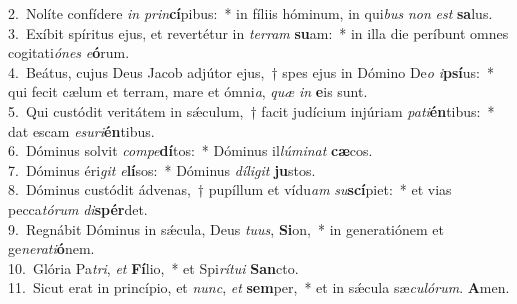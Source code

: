 {2.~}Nolíte confídere \textit{in} \textit{prin}\textbf{cí}pibus:~* in fíliis hóminum, in qui\textit{bus} \textit{non} \textit{est} \textbf{sa}lus.\\
{3.~}Exíbit spíritus ejus, et revertétur in \textit{ter}\textit{ram} \textbf{su}am:~* in illa die períbunt omnes cogitati\textit{ó}\textit{nes} \textit{e}\textbf{ó}rum.\\
{4.~}Beátus, cujus Deus Jacob adjútor ejus,~† spes ejus in Dómino De\textit{o} \textit{i}\textbf{psí}us:~* qui fecit cælum et terram, mare et ómni\textit{a}, \textit{quæ} \textit{in} \textbf{e}is sunt.\\
{5.~}Qui custódit veritátem in sǽculum,~† facit judícium injúriam \textit{pa}\textit{ti}\textbf{én}tibus:~* dat escam \textit{e}\textit{su}\textit{ri}\textbf{én}tibus.\\
{6.~}Dóminus solvit \textit{com}\textit{pe}\textbf{dí}tos:~* Dóminus il\textit{lú}\textit{mi}\textit{nat} \textbf{cæ}cos.\\
{7.~}Dóminus éri\textit{git} \textit{e}\textbf{lí}sos:~* Dóminus \textit{dí}\textit{li}\textit{git} \textbf{ju}stos.\\
{8.~}Dóminus custódit ádvenas,~† pupíllum et vídu\textit{am} \textit{su}\textbf{scí}piet:~* et vias pecca\textit{tó}\textit{rum} \textit{di}\textbf{spér}det.\\
{9.~}Regnábit Dóminus in sǽcula, Deus \textit{tu}\textit{us}, \textbf{Si}on,~* in generatiónem et ge\textit{ne}\textit{ra}\textit{ti}\textbf{ó}nem.\\
{10.~}Glória Pa\textit{tri}, \textit{et} \textbf{Fí}lio,~* et Spi\textit{rí}\textit{tu}\textit{i} \textbf{San}cto.\\
{11.~}Sicut erat in princípio, et \textit{nunc}, \textit{et} \textbf{sem}per,~* et in sǽcula sæ\textit{cu}\textit{ló}\textit{rum}. \textbf{A}men.\\
